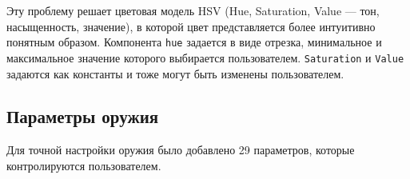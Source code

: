 Эту проблему решает цветовая модель HSV (Hue, Saturation, Value — тон, насыщенность, значение), в которой цвет представляется более интуитивно понятным образом. Компонента \lstinline{hue} задается в виде отрезка, минимальное и максимальное значение которого выбирается пользователем. \lstinline{Saturation} и \lstinline{Value} задаются как константы и тоже могут быть изменены пользователем.



\subsection{Параметры оружия}
Для точной настройки оружия было добавлено 29 параметров, которые контролируются пользователем.

\vspace{5mm}


